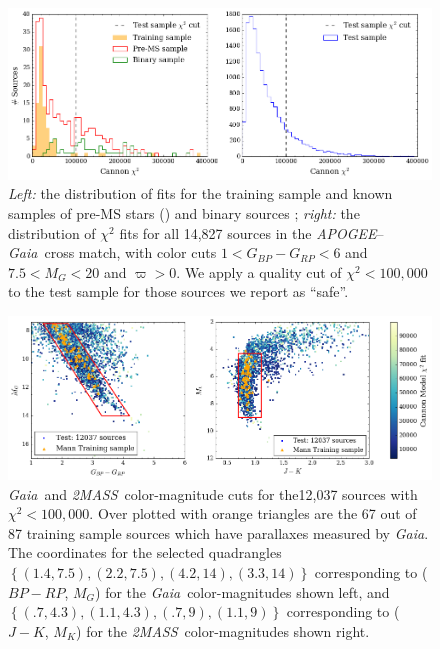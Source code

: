\documentclass[twocolumn]{aastex62}
\newcommand{\apogee}{\textsl{APOGEE}}
\newcommand{\gaia}{\textsl{Gaia}}
\newcommand{\zmass}{\textsl{2MASS}}
\begin{document}


\begin{figure}
	\includegraphics[width=\linewidth]{figures/cannon_chi_dist.png}
	\caption{\textit{Left:} the distribution of fits for the training sample and known samples of pre-MS stars (\citealt{Cottaar:2014}) and binary sources \citep{ElBadry:2018,Skinner:2018}; \textit{right:} the distribution of $\chi^2$ fits for all 14,827 sources in the \apogee --\gaia\ cross match, with color cuts $1<G_{BP}-G_{RP}<6$ and $7.5<M_{G}<20$ and $\varpi>0$. We apply a quality cut of $\chi^2 < 100,000$ to the test sample for those sources we report as ``safe''.}
	\label{fig:chi_dist}
\end{figure}

\begin{figure}
	\includegraphics[width=\linewidth]{figures/cmd_selection.png}
	\caption{\gaia\ and \zmass\ color-magnitude cuts for the12,037 sources with $\chi^2<100,000$. Over plotted with orange triangles are the 67 out of 87 training sample sources which have parallaxes measured by \gaia. The coordinates for the selected quadrangles 
	$\left\{ (1.4, 7.5), (2.2, 7.5), (4.2, 14), (3.3, 14) \right\}$ corresponding to ($BP-RP$, $M_G$) for the \gaia\ color-magnitudes shown left, and 
	$\left\{ (.7, 4.3), (1.1, 4.3), (.7, 9), (1.1, 9) \right\}$ corresponding to ($J-K$, $M_K$) for the \zmass\ color-magnitudes shown right. }
	\label{fig:cmd_selection}
\end{figure}
\end{document}
